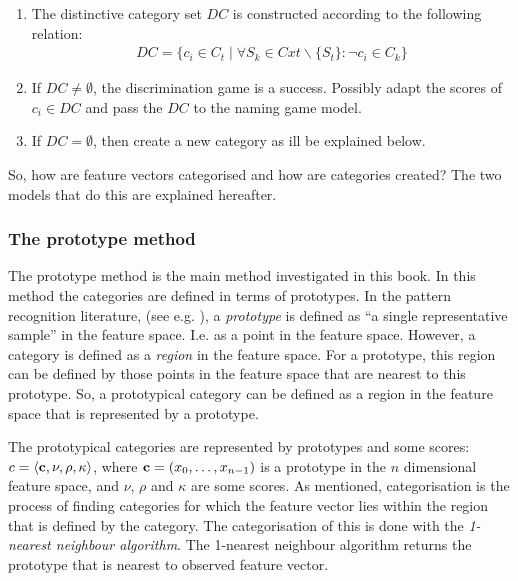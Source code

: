 \begin{enumerate}

\item The distinctive category set $DC$ is constructed according to the following relation:
\begin{eqnarray}
DC = \{c_i \in C_t \mid \forall S_k \in Cxt \backslash \{S_t\}: \neg c_i \in C_k\}
\end{eqnarray}

\item If $DC \neq \emptyset$, the discrimination game is a success. Possibly adapt the scores of $c_i \in DC$ and pass the $DC$ to the naming game model.

\item If $DC = \emptyset$, then create a new category as ill be explained below.

\end{enumerate}


So, how are feature vectors categorised and how are categories created? The two models that do this are explained hereafter.

\subsubsection{The prototype method}\label{s:cm:prototype}


The prototype method is the main method investigated in this book. In this method the categories are defined in terms of prototypes. In the pattern recognition literature, (see e.g. \citealt{banks:1990}), a {\em prototype} is defined as ``a single representative sample'' in the feature space. I.e. as a point in the feature space. However, a category is defined as a {\em region} in the feature space. For a prototype, this region can be defined by those points in the feature space that are nearest to this prototype. So, a prototypical category can be defined as a region in the feature space that is represented by a prototype.


The prototypical categories are represented by prototypes and some scores: $c=\langle {\bf c},\nu,\rho,\kappa \rangle$, where ${\bf c}=(x_0,\ldots,x_{n-1})$ is a prototype in the $n$ dimensional feature space, and $\nu$, $\rho$ and $\kappa$ are some scores. As mentioned, categorisation is the process of finding categories for which the feature vector lies within the region that is defined by the category. The categorisation of this is done with the {\em 1-nearest neighbour algorithm}. The 1-nearest neighbour algorithm returns the prototype that is nearest to observed feature vector. 

